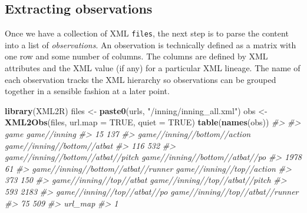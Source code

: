 \documentclass[12pt,]{isuthesis}
\newenvironment{Shaded}{\begin{snugshade}}{\end{snugshade}}
\newcommand{\KeywordTok}[1]{\textcolor[rgb]{0.13,0.29,0.53}{\textbf{{#1}}}}
\newcommand{\DataTypeTok}[1]{\textcolor[rgb]{0.13,0.29,0.53}{{#1}}}
\newcommand{\StringTok}[1]{\textcolor[rgb]{0.31,0.60,0.02}{{#1}}}
\newcommand{\CommentTok}[1]{\textcolor[rgb]{0.56,0.35,0.01}{\textit{{#1}}}}
\newcommand{\OtherTok}[1]{\textcolor[rgb]{0.56,0.35,0.01}{{#1}}}
\newcommand{\NormalTok}[1]{{#1}}
\begin{document}
\subsection{Extracting observations}\label{extracting-observations}

Once we have a collection of XML \texttt{files}, the next step is to
parse the content into a list of \textit{observations}. An observation
is technically defined as a matrix with one row and some number of
columns. The columns are defined by XML attributes and the XML value (if
any) for a particular XML lineage. The name of each observation tracks
the XML hierarchy so observations can be grouped together in a sensible
fashion at a later point.

\begin{Shaded}
\begin{Highlighting}[]
\KeywordTok{library}\NormalTok{(XML2R)}
\NormalTok{files <-}\StringTok{ }\KeywordTok{paste0}\NormalTok{(urls, }\StringTok{"/inning/inning_all.xml"}\NormalTok{)}
\NormalTok{obs <-}\StringTok{ }\KeywordTok{XML2Obs}\NormalTok{(files, }\DataTypeTok{url.map =} \OtherTok{TRUE}\NormalTok{, }\DataTypeTok{quiet =} \OtherTok{TRUE}\NormalTok{) }
\KeywordTok{table}\NormalTok{(}\KeywordTok{names}\NormalTok{(obs))}
\CommentTok{#> }
\CommentTok{#>                                game                        game//inning }
\CommentTok{#>                                  15                                 137 }
\CommentTok{#>        game//inning//bottom//action         game//inning//bottom//atbat }
\CommentTok{#>                                 116                                 532 }
\CommentTok{#>  game//inning//bottom//atbat//pitch     game//inning//bottom//atbat//po }
\CommentTok{#>                                1978                                  61 }
\CommentTok{#> game//inning//bottom//atbat//runner           game//inning//top//action }
\CommentTok{#>                                 373                                 150 }
\CommentTok{#>            game//inning//top//atbat     game//inning//top//atbat//pitch }
\CommentTok{#>                                 593                                2183 }
\CommentTok{#>        game//inning//top//atbat//po    game//inning//top//atbat//runner }
\CommentTok{#>                                  75                                 509 }
\CommentTok{#>                             url_map }
\CommentTok{#>                                   1}
\end{Highlighting}
\end{Shaded}
\end{document}
